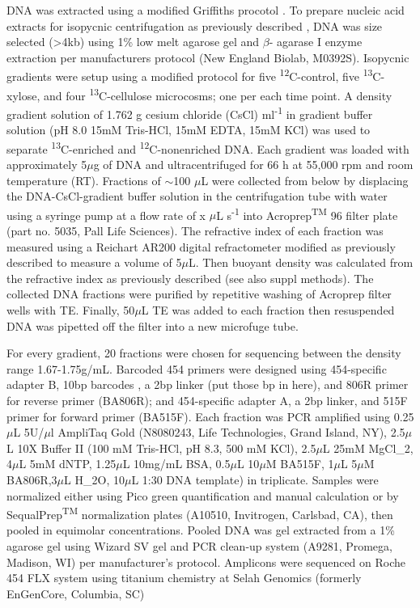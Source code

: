 DNA was extracted using a modified Griffiths procotol \cite{Griffiths_2000}. To prepare nucleic acid extracts for isopycnic centrifugation as previously described \cite{Buckley_2007}, DNA was size selected (\textgreater4kb) using 1\% low melt agarose gel and $\beta$- agarase I enzyme extraction per manufacturers protocol (New England Biolab, M0392S). Isopycnic gradients were setup using a modified protocol \cite{Neufeld_2007} for five \textsuperscript{12}C-control, five \textsuperscript{13}C-xylose, and four \textsuperscript{13}C-cellulose microcosms; one per each time point. A density gradient solution of 1.762 g cesium chloride (CsCl) ml\textsuperscript{-1} in gradient buffer solution (pH 8.0 15mM Tris-HCl, 15mM EDTA, 15mM KCl) was used to separate \textsuperscript{13}C-enriched and \textsuperscript{12}C-nonenriched DNA. Each gradient was loaded with approximately 5$\mu$g of DNA and ultracentrifuged for 66 h at 55,000 rpm and room temperature (RT). Fractions of $\sim$100 $\mu$L were collected from below by displacing the DNA-CsCl-gradient buffer solution in the centrifugation tube with water using a syringe pump at a flow rate of x $\mu$L s\textsuperscript{-1} \cite{Manefield_2002} into Acroprep\textsuperscript{TM} 96 filter plate (part no. 5035, Pall Life Sciences). The refractive index of each fraction was measured using a Reichart AR200 digital refractometer modified as previously described \cite{Buckley_2007} to measure a volume of 5$\mu$L. Then buoyant density was calculated from the refractive index as previously described \cite{Buckley_2007} (see also suppl methods). The collected DNA fractions were purified by repetitive washing of Acroprep filter wells with TE. Finally, 50$\mu$L TE was added to each fraction then resuspended DNA was pipetted off the filter into a new microfuge tube. 


For every gradient, 20 fractions were chosen for sequencing between the density range 1.67-1.75g/mL. Barcoded 454 primers were designed using 454-specific adapter B, 10bp barcodes \cite{Hamady_2008}, a 2bp linker (put those bp in here), and 806R primer for reverse primer (BA806R); and 454-specific adapter A, a 2bp linker, and 515F primer for forward primer (BA515F). Each fraction was PCR amplified using 0.25$\mu$L 5U/$\mu$l AmpliTaq Gold (N8080243, Life Technologies, Grand Island, NY), 2.5$\mu$L 10X Buffer II (100 mM Tris-HCl, pH 8.3, 500 mM KCl), 2.5$\mu$L 25mM MgCl_{2}, 4$\mu$L 5mM dNTP, 1.25$\mu$L 10mg/mL BSA, 0.5$\mu$L 10$\mu$M BA515F, 1$\mu$L 5$\mu$M BA806R,3$\mu$L H_{2}O, 10$\mu$L 1:30 DNA template) in triplicate. Samples were normalized either using Pico green quantification and manual calculation or by SequalPrep\textsuperscript{TM} normalization plates (A10510, Invitrogen, Carlsbad, CA), then pooled in equimolar concentrations.  Pooled DNA was gel extracted from a 1\% agarose gel using Wizard SV gel and PCR clean-up system (A9281, Promega, Madison, WI) per manufacturer's protocol.  Amplicons were sequenced on Roche 454 FLX system using titanium chemistry at Selah Genomics (formerly EnGenCore, Columbia, SC)  
